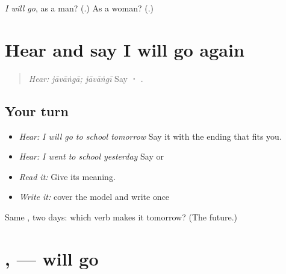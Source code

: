 \begin{tcolorbox}[breakable,colback=teal!4,colframe=teal!35!black,title={Before you move on}]
\emph{I will go}, as a man? (\textbf{}.) As a woman? (\textbf{}.)
\end{tcolorbox}
\section[\texorpdfstring{\pa{ਜਾਵਾਂਗਾ} · \pa{ਜਾਵਾਂਗੀ} (jāvāṅgā · jāvāṅgī)}{ਜਾਵਾਂਗਾ · ਜਾਵਾਂਗੀ (jāvāṅgā · jāvāṅgī)}]{Hear and say I will go again}

\label{lesson:PA-C221-javanga-review}



\begin{quote}
\emph{Hear:} \emph{jāvāṅgā; jāvāṅgī} Say \textbf{ · }.
\end{quote}

\subsection*{Your turn}
\begin{itemize}
\raggedright
  \item \emph{Hear:} \emph{I will go to school tomorrow} Say it with the ending that fits you.
  \item \emph{Hear:} \emph{I went to school yesterday} Say \textbf{   } or \textbf{   }
  \item \emph{Read it:} \textbf{   } Give its meaning.
  \item \emph{Write it:} cover the model and write \textbf{} once
\end{itemize}

\begin{tcolorbox}[breakable,colback=teal!4,colframe=teal!35!black,title={Before you move on}]
Same \textbf{}, two days: which verb makes it tomorrow? (The future.)
\end{tcolorbox}
\section[\texorpdfstring{\pa{ਜਾਵੇਗਾ} · \pa{ਜਾਵੇਗੀ} (jāvegā · jāvegī)}{ਜਾਵੇਗਾ · ਜਾਵੇਗੀ (jāvegā · jāvegī)}]{,  — will go}

\label{lesson:PA-C221-javega}



